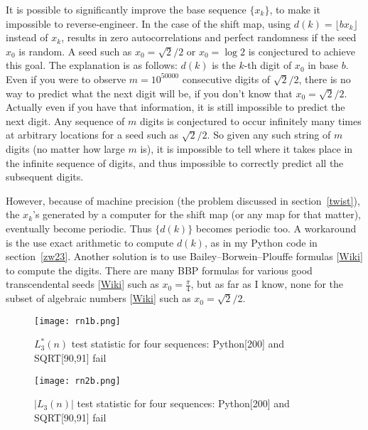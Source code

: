 \documentclass[oneside,10pt]{book}
\begin{document}
It is possible to significantly improve the base sequence $\{x_k\}$, to make it impossible to reverse-engineer. In the case of the shift map, using $d(k)=\lfloor bx_k\rfloor$ instead of $x_k$, results in zero autocorrelations and perfect randomness if the seed $x_0$ is random. A seed such as $x_0=\sqrt{2}/2$ or $x_0=\log 2$
is conjectured to achieve this goal. The explanation is as follows: $d(k)$ is the $k$-th digit of $x_0$ in base $b$. Even if you were to observe $m=10^{\num{50000}}$ consecutive digits of $\sqrt{2}/2$, there is no way to predict what the next digit will be, if you don't know that $x_0=\sqrt{2}/2$. Actually even if you have that information, it is still impossible to predict the next digit. Any sequence of $m$ digits is conjectured to occur infinitely many times at arbitrary locations for a seed such as $\sqrt{2}/2$. So given any such string of $m$ digits (no matter how large $m$ is), it is impossible to tell where it takes place in the infinite sequence of digits, and thus impossible to correctly predict all the subsequent digits.

However, because of machine precision (the problem discussed in section~\ref{twist}), the $x_k$'s generated by a computer for the shift map (or any map for that matter), eventually become periodic. Thus $\{d(k)\}$ becomes periodic too. A workaround is the use exact arithmetic to compute $d(k)$, as in my Python code in section~\ref{zw23}. Another solution is to use
 \textcolor{index}{Bailey–Borwein–Plouffe formulas} [\href{https://en.wikipedia.org/wiki/Bailey\%E2\%80\%93Borwein\%E2\%80\%93Plouffe_formula}{Wiki}]
 to compute the digits. There are many BBP formulas for various good \textcolor{index}{transcendental} seeds [\href{https://en.wikipedia.org/wiki/Transcendental_number}{Wiki}]
  such as $x_0=\frac{\pi}{4}$, but as far as I know, none for
  the subset of \textcolor{index}{algebraic numbers} [\href{https://en.wikipedia.org/wiki/Algebraic_number}{Wiki}] such as $x_0=\sqrt{2}/2$.

\begin{figure}%
\centering
\texttt{[image: rn1b.png]}
\caption{$L_3^*(n)$ test statistic for four sequences: Python[200] and SQRT[90,91] fail}
\label{fig:rn1}
\end{figure}

\begin{figure}%
\centering
\texttt{[image: rn2b.png]}
\caption{$|L_3(n)|$  test statistic for four sequences: Python[200] and SQRT[90,91] fail}
\label{fig:rn2}
\end{figure}
\end{document}
